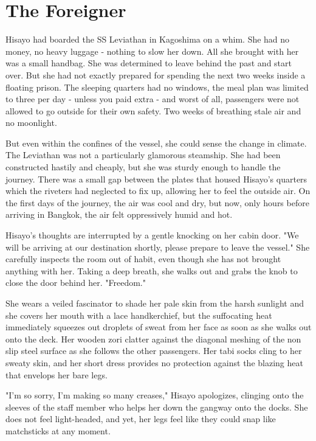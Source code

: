 \chapter{The Foreigner}

Hisayo had boarded the SS Leviathan in Kagoshima on a whim.
She had no money, no heavy luggage - nothing to slow her down.
All she brought with her was a small handbag.
She was determined to leave behind the past and start over.
But she had not exactly prepared for spending the next two weeks inside a floating prison.
The sleeping quarters had no windows, the meal plan was limited to three per day - unless you paid extra - and worst of all, passengers were not allowed to go outside for their own safety.
Two weeks of breathing stale air and no moonlight.

But even within the confines of the vessel, she could sense the change in climate.
The Leviathan was not a particularly glamorous steamship.
She had been constructed hastily and cheaply, but she was sturdy enough to handle the journey.
There was a small gap between the plates that housed Hisayo's quarters which the riveters had neglected to fix up, allowing her to feel the outside air.
On the first days of the journey, the air was cool and dry, but now, only hours before arriving in Bangkok, the air felt oppressively humid and hot.

Hisayo's thoughts are interrupted by a gentle knocking on her cabin door.
"We will be arriving at our destination shortly, please prepare to leave the vessel." She carefully inspects the room out of habit, even though she has not brought anything with her.
Taking a deep breath, she walks out and grabs the knob to close the door behind her.
"Freedom."

She wears a veiled fascinator to shade her pale skin from the harsh sunlight and she covers her mouth with a lace handkerchief, but the suffocating heat immediately squeezes out droplets of sweat from her face as soon as she walks out onto the deck.
Her wooden zori clatter against the diagonal meshing of the non slip steel surface as she follows the other passengers.
Her tabi socks cling to her sweaty skin, and her short dress provides no protection against the blazing heat that envelops her bare legs.

"I'm so sorry, I'm making so many creases," Hisayo apologizes, clinging onto the sleeves of the staff member who helps her down the gangway onto the docks.
She does not feel light-headed, and yet, her legs feel like they could snap like matchsticks at any moment.


